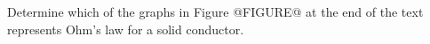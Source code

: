 Determine which of the graphs in Figure @FIGURE@ at the end of the text
represents Ohm’s law for a solid conductor. %